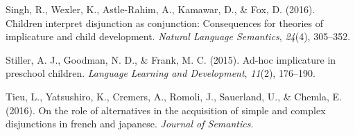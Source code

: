 \documentclass[man]{apa6}
\theoremstyle{definition}
\theoremstyle{definition}
\theoremstyle{definition}
\theoremstyle{remark}
\begin{document}
\hypertarget{ref-Singh2016}{}
Singh, R., Wexler, K., Astle-Rahim, A., Kamawar, D., \& Fox, D. (2016).
Children interpret disjunction as conjunction: Consequences for theories
of implicature and child development. \emph{Natural Language Semantics},
\emph{24}(4), 305--352.

\hypertarget{ref-stiller2015ad}{}
Stiller, A. J., Goodman, N. D., \& Frank, M. C. (2015). Ad-hoc
implicature in preschool children. \emph{Language Learning and
Development}, \emph{11}(2), 176--190.

\hypertarget{ref-tieu2016}{}
Tieu, L., Yatsushiro, K., Cremers, A., Romoli, J., Sauerland, U., \&
Chemla, E. (2016). On the role of alternatives in the acquisition of
simple and complex disjunctions in french and japanese. \emph{Journal of
Semantics}.
\end{document}
